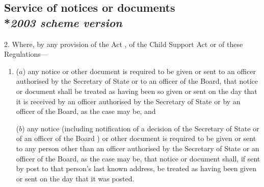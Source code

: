 \documentclass[12pt,a4paper]{article}
\begin{document}
\subsection[2. Service of notices or documents --- \emph{2003 scheme version}]{Service of notices or documents\\*\emph{2003 scheme version}}

2.  Where, by any provision of the Act%
, of the Child Support Act
or of these Regulations—
\begin{enumerate}\item[]
($a$) any notice or other document is required to be given or sent 
to an officer authorised by the Secretary of State
or to an officer of the Board,  %
that notice or document shall be treated as having been so given or sent on the day that it is received 
by an officer authorised by the Secretary of State
or by an officer of the Board,  %
as the case may be, and

($b$) any notice (including notification of a decision of the Secretary of State
or of an officer of the Board%
) or other document is required to be given or sent to any person other than 
an officer  %
authorised by the Secretary of State
or an officer of the Board,  %
as the case may be, that notice or document shall, if sent by post to that person’s last known address, be treated as having been given or sent on the day that it was posted.\end{enumerate}

\end{document}
